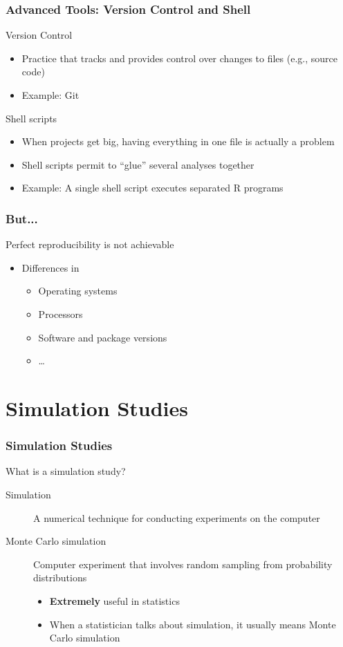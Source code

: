 \documentclass[paper=screen,mathserif]{beamer}\usepackage[]{graphicx}\usepackage[]{color}
\begin{document}
\begin{frame}
  \frametitle{Advanced Tools: Version Control and Shell}
  Version Control
  \begin{itemize}
  \item Practice that tracks and provides control over changes to
    files (e.g., source code)
  \item Example: Git
  \end{itemize}
  Shell scripts
  \begin{itemize}
  \item When projects get big, having everything in one file is
    actually a problem
  \item Shell scripts permit to ``glue'' several analyses together
  \item Example: A single shell script executes separated R programs
  \end{itemize}
\end{frame}

\begin{frame}
  \frametitle{But...}
  Perfect reproducibility is not achievable
  \begin{itemize}
  \item Differences in
    \begin{itemize}
    \item Operating systems
    \item Processors
    \item Software and package versions
    \item \dots
    \end{itemize}
  \end{itemize}
\end{frame}

\section{Simulation Studies}

\begin{frame}
  \frametitle{Simulation Studies}
  What is a simulation study?
  \begin{description}
  \item[Simulation] A numerical technique for conducting experiments
    on the computer
  \item[Monte Carlo simulation] Computer experiment that involves
    random sampling from probability distributions
    \begin{itemize}
    \item {\bf Extremely} useful in statistics
    \item When a statistician talks about simulation, it usually means
      Monte Carlo simulation
    \end{itemize}
  \end{description}
\end{frame}
\end{document}
